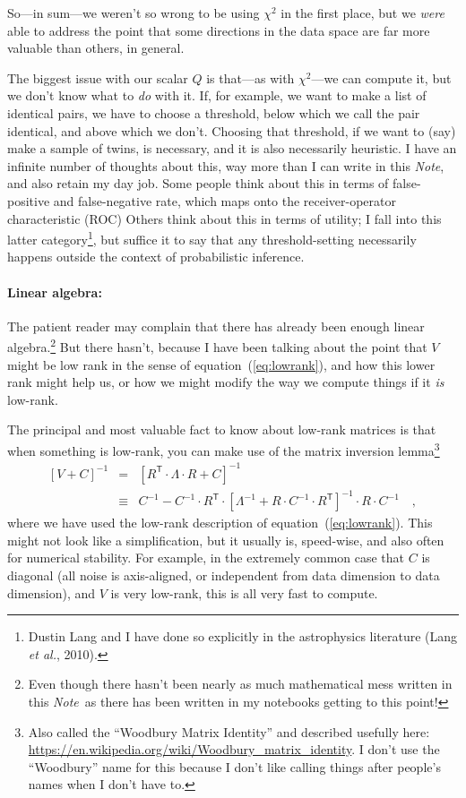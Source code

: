 \documentclass[12pt,letterpaper]{article}
\newcommand{\foreign}[1]{\textsl{#1}}
\newcommand{\acronym}[1]{{\small{#1}}}
\newcommand{\documentname}{\textsl{Note}}
\newcommand{\equationname}{equation}
\newcommand{\etal}{\foreign{et al.}}
\newcommand{\tra}[1]{{#1}^{\mathsf{T}}}
\newcommand{\inv}[1]{{#1}^{-1}}
\begin{document}
So---in sum---we weren't so wrong to be using $\chi^2$ in the first
place, but we \emph{were} able to address the point that some directions
in the data space are far more valuable than others, in general.

The biggest issue with our scalar $Q$ is that---as with $\chi^2$---we
can compute it, but we don't know what to \emph{do} with it. If, for
example, we want to make a list of identical pairs, we have to choose
a threshold, below which we call the pair identical, and above which
we don't. Choosing that threshold, if we want to (say) make a sample
of twins, is necessary, and it is also necessarily heuristic. I have
an infinite number of thoughts about this, way more than I can write
in this \documentname, and also retain my day job. Some people think about
this in terms of false-positive and false-negative rate, which maps
onto the receiver-operator characteristic (\acronym{ROC}) Others think
about this in terms of utility; I fall into this latter
category\footnote{Dustin Lang and I have done so explicitly in the
  astrophysics literature (Lang \etal, 2010).},
but suffice it to say that any threshold-setting necessarily happens
outside the context of probabilistic inference.

\paragraph{Linear algebra:}
The patient reader may complain that there has already been enough
linear algebra.\footnote{Even though there hasn't been nearly as much
  mathematical mess written in this \documentname\ as there has been written
  in my notebooks getting to this point!}  But there hasn't, because I
have been talking about the point that $V$ might be low rank in the
sense of \equationname~(\ref{eq:lowrank}), and how this lower rank
might help us, or how we might modify the way we compute things if it
\emph{is} low-rank.

The principal and most valuable fact to know about low-rank matrices
is that when something is low-rank, you can make use of the matrix
inversion lemma\footnote{Also called the ``Woodbury Matrix Identity''
  and described usefully here:
  \url{https://en.wikipedia.org/wiki/Woodbury_matrix_identity}. I
  don't use the ``Woodbury'' name for this because I don't like
  calling things after people's names when I don't have to.}
\begin{eqnarray}
\inv{[V + C]} &=& \inv{[\tra{R}\cdot\Lambda\cdot R + C]}
\\
 &\equiv& \inv{C} - \inv{C}\cdot\tra{R}\cdot \inv{[\inv{\Lambda} + R\cdot \inv{C}\cdot\tra{R}]}\cdot R\cdot\inv{C}
\quad ,
\end{eqnarray}
where we have used the low-rank description of \equationname~(\ref{eq:lowrank}).
This might not look like a simplification, but it usually is, speed-wise, and
also often for numerical stability.
For example, in the extremely common case that $C$ is diagonal (all
noise is axis-aligned, or independent from data dimension to data
dimension), and $V$ is very low-rank, this is all very fast to
compute.
\end{document}
